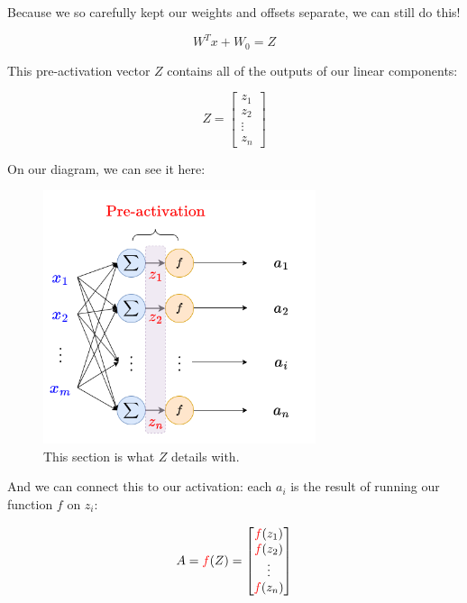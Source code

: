         Because we so carefully kept our weights and offsets separate, we can still do this!
        
        \begin{equation}
            W^Tx + W_0 = Z
        \end{equation}
        
        This pre-activation vector $Z$ contains all of the outputs of our linear components:
        
        \begin{equation}
            Z = 
            \begin{bmatrix}
              z_1 \\ z_2 \\ \vdots \\ z_n
            \end{bmatrix}
        \end{equation}
        
        On our diagram, we can see it here:
        
        \begin{figure}[H]
            \centering
            \includegraphics[width=80mm,scale=0.4]{images/nn_images/pre_activation.png}
            \caption*{This section is what $Z$ details with.}
        \end{figure}
        
        And we can connect this to our activation: each $a_i$ is the result of running our function $f$ on $z_i$:
        
        \begin{equation}
            A = 
            \textcolor{red}{f}(Z)=
            \begin{bmatrix}
              \textcolor{red}{f}(z_1) \\ \textcolor{red}{f}(z_2) \\ \vdots \\ \textcolor{red}{f}(z_n)
            \end{bmatrix}
        \end{equation}
        
